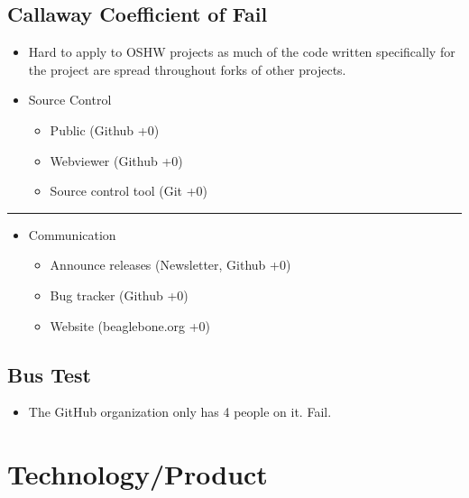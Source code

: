 \subsection{Callaway Coefficient of
Fail}\label{callaway-coefficient-of-fail}

\begin{itemize}
\itemsep1pt\parskip0pt
\item
  Hard to apply to OSHW projects as much of the code written
  specifically for the project are spread throughout forks of other
  projects.
\item
  Source Control

  \begin{itemize}
  \itemsep1pt\parskip0pt
  \item
    Public (Github +0)
  \item
    Webviewer (Github +0)
  \item
    Source control tool (Git +0)
  \end{itemize}
\end{itemize}

\begin{center}\rule{3in}{0.4pt}\end{center}

\begin{itemize}
\itemsep1pt\parskip0pt
\item
  Communication

  \begin{itemize}
  \itemsep1pt\parskip0pt
  \item
    Announce releases (Newsletter, Github +0)
  \item
    Bug tracker (Github +0)
  \item
    Website (beaglebone.org +0)
  \end{itemize}
\end{itemize}

\subsection{Bus Test}\label{bus-test}

\begin{itemize}
\itemsep1pt\parskip0pt
\item
  The GitHub organization only has 4 people on it. Fail.
\end{itemize}

\section{Technology/Product}\label{technologyproduct}

